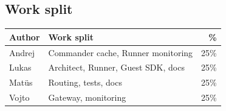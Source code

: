 \documentclass[11pt,a4paper]{article}
\begin{document}
\subsection*{Work split}

\begin{center}
	\begin{tabular}{|l|l|r|}
		\hline
		Author  & Work split                         & \%   \\
		\hline
		Andrej  & Commander cache, Runner monitoring & 25\% \\
		Lukas   & Architect, Runner, Guest SDK, docs & 25\% \\
		Mat\"us & Routing, tests, docs               & 25\% \\
		Vojto   & Gateway, monitoring                & 25\% \\
		\hline
	\end{tabular}
\end{center}
\end{document}
